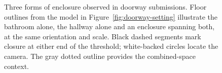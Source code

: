 \begin{figure}[t]
\centering
\setcounter{subfigure}{0}
\begin{minipage}{130mm}
\centering
{}%
\hfill%
%
\hfill%
\end{minipage}
\caption{Three forms of enclosure observed in doorway submissions. Floor outlines from the model in Figure~\ref{fig:doorway-setting} illustrate the bathroom alone, the hallway alone and an enclosure spanning both, at the same orientation and scale. Black dashed segments mark closure at either end of the threshold; white-backed circles locate the camera. The gray dotted outline provides the combined-space context.}
\label{fig:doorway-scene}
\end{figure}
